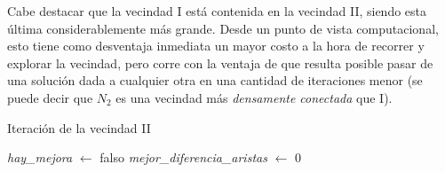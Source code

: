 Cabe destacar que la vecindad I está contenida en la vecindad II,
siendo esta última considerablemente más grande. Desde un punto de vista
computacional, esto tiene como desventaja inmediata un mayor costo a la hora
de recorrer y explorar la vecindad, pero corre con la ventaja de que resulta
posible pasar de una solución dada a cualquier otra en una cantidad de
iteraciones menor (se puede decir que $N_2$ es una vecindad más
\emph{densamente conectada} que I).


\begin{algorithm}[H]
    \SetAlgoVlined
    \caption{Iteración de la vecindad II}
    \textit{hay\_mejora} $\gets$ \textsf{falso} \;
    \textit{mejor\_diferencia\_aristas} $\gets$ 0 \;


\end{algorithm}
